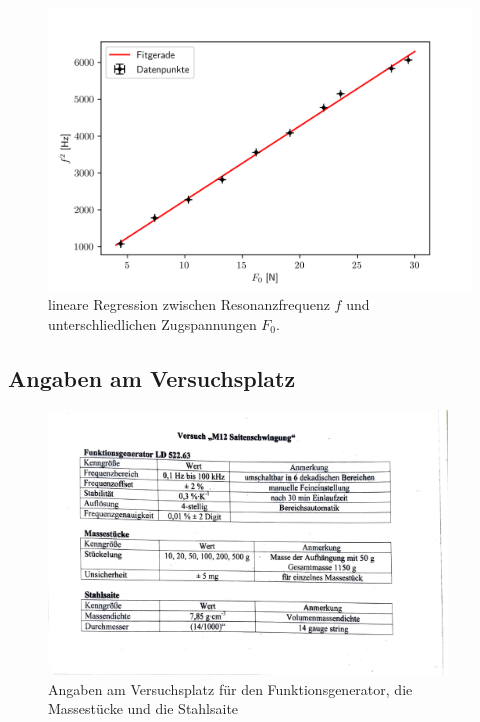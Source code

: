 \documentclass[bibliography=totocnumbered]{scrartcl}
\begin{document}
\newpage
\begin{figure}[!ht]
	\centering									%
	\includegraphics[width=350pt]{fotos/gpr1/Regression_A3.png}			%
	\caption{lineare Regression zwischen Resonanzfrequenz $ f $ und unterschliedlichen Zugspannungen $ F_{0} $.}							%
	\label{Abb: Regression 3}							%
\end{figure}
\subsection{Angaben am Versuchsplatz}

\begin{figure}[!ht]
	\centering									%
	\includegraphics[width=300pt]{fotos/gpr1/Versuch.M12.pdf}			%
	\caption{Angaben am Versuchsplatz für den Funktionsgenerator, die Massestücke und die Stahlsaite}							%
	\label{Abb: Agaben}							%
\end{figure}

\newpage


	\newpage
	
	\printbibliography[title={Quellenverzeichnis}]
	
	
\end{document}
